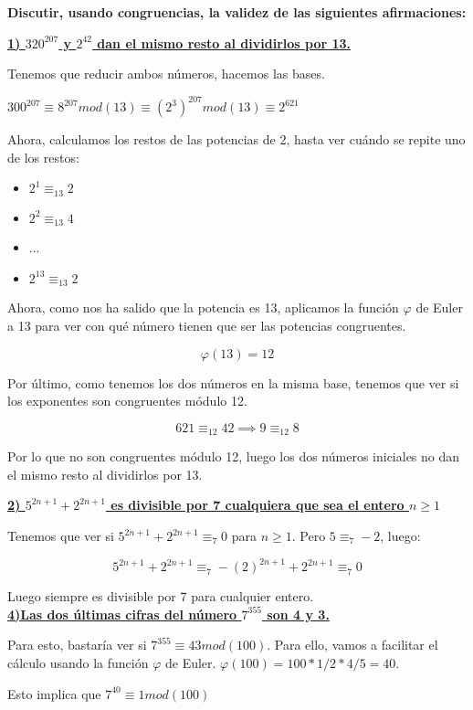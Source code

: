 \documentclass[11pt, a4paper, titlepage]{article}
\begin{document}
\textbf{ Discutir, usando congruencias, la validez de las siguientes afirmaciones:}

\underline{\textbf{1) $320^{207}$ y $2^{42}$ dan el mismo resto al dividirlos por 13.}}

Tenemos que reducir ambos números, hacemos las bases.

$300^{207}\equiv 8^{207}mod(13) \equiv (2^3)^{207} mod(13) \equiv 2^{621}$

Ahora, calculamos los restos de las potencias de 2, hasta ver cuándo se repite uno de los restos:

\begin{itemize}
	\item $2^1 \equiv_{13} 2$
	\item $2^2 \equiv_{13} 4$
	\item ...
	\item $2^{13} \equiv_{13} 2$
\end{itemize}

Ahora, como nos ha salido que la potencia es 13, aplicamos la función $\varphi$ de Euler a 13 para ver con qué número tienen que ser las potencias congruentes.

\[
\varphi(13) = 12
\]

Por último, como tenemos los dos números en la misma base, tenemos que ver si los exponentes son congruentes módulo 12.

\[
621 \equiv_{12} 42 \implies 9 \equiv_{12} 8
\]

Por lo que no son congruentes módulo 12, luego los dos números iniciales no dan el mismo resto al dividirlos por 13.

\textbf{\underline{2) $5^{2n+1} + 2^{2n+1}$ es divisible por 7 cualquiera que sea el entero $n \geq 1$}}

Tenemos que ver si $5^{2n+1} + 2^{2n+1} \equiv_7 0$ para $n\geq 1$. Pero $5\equiv_7 -2$, luego:

\[
5^{2n+1} + 2^{2n+1} \equiv_7 -(2)^{2n+1} + 2^{2n+1} \equiv_7 0
\]

Luego siempre es divisible por 7 para cualquier entero.\\


\underline{\textbf{4)Las dos últimas cifras del número $7^{355}$ son 4 y 3.}}

Para esto, bastaría ver si $7^{355} \equiv 43 mod(100)$. Para ello, vamos a facilitar el cálculo usando la función $\varphi$ de Euler. $\varphi(100) = 100*1/2 * 4/5 = 40$.

Esto implica que $ 7^{40} \equiv 1 mod(100)$
\end{document}
